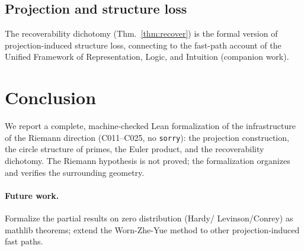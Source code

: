 \documentclass[sigplan,10pt,anonymous,review]{acmart}
\begin{document}
\subsection{Projection and structure loss}
The recoverability dichotomy (Thm.~\ref{thm:recover}) is the formal version of
projection-induced structure loss, connecting to the fast-path account of the
Unified Framework of Representation, Logic, and Intuition (companion work).

\section{Conclusion}

We report a complete, machine-checked Lean formalization of the infrastructure of the
Riemann direction (C011--C025, no \texttt{sorry}): the projection construction, the
circle structure of primes, the Euler product, and the recoverability dichotomy. The
Riemann hypothesis is not proved; the formalization organizes and verifies the
surrounding geometry.

\paragraph{Future work.} Formalize the partial results on zero distribution (Hardy/
Levinson/Conrey) as mathlib theorems; extend the Worn-Zhe-Yue method to other
projection-induced fast paths.




\end{document}

